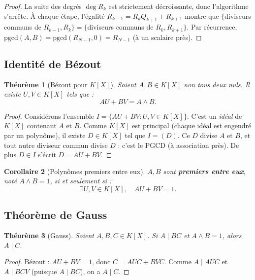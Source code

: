 \documentclass[12pt,a4paper]{report}
\newtheorem{theoreme}{Théorème}[section]
\newtheorem{corollaire}[theoreme]{Corollaire}
\theoremstyle{definition}
\theoremstyle{remark}
\begin{document}
\begin{proof}
La suite des degrés $\deg R_k$ est strictement décroissante, donc l'algorithme s'arrête. À chaque étape, l'égalité $R_{k-1} = R_k Q_{k+1} + R_{k+1}$ montre que $\{$diviseurs communs de $R_{k-1}, R_k\} = \{$diviseurs communs de $R_k, R_{k+1}\}$. Par récurrence, $\mathrm{pgcd}(A, B) = \mathrm{pgcd}(R_{N-1}, 0) = R_{N-1}$ (à un scalaire près).
\end{proof}

\subsection{Identité de Bézout}

\begin{theoreme}[{Bézout pour $K[X]$}]
Soient $A, B \in K[X]$ non tous deux nuls. Il existe $U, V \in K[X]$ tels que :
\[ A U + B V = A \wedge B. \]
\end{theoreme}

\begin{proof}
Considérons l'ensemble $I = \{ A U + B V : U, V \in K[X]\}$. C'est un \emph{idéal} de $K[X]$ contenant $A$ et $B$. Comme $K[X]$ est principal (chaque idéal est engendré par un polynôme), il existe $D \in K[X]$ tel que $I = (D)$. Ce $D$ divise $A$ et $B$, et tout autre diviseur commun divise $D$ : c'est le PGCD (à association près). De plus $D \in I$ s'écrit $D = A U + B V$.
\end{proof}

\begin{corollaire}[Polynômes premiers entre eux]
$A, B$ sont \textbf{premiers entre eux}, noté $A \wedge B = 1$, si et seulement si :
\[ \exists U, V \in K[X],\quad A U + B V = 1. \]
\end{corollaire}

\subsection{Théorème de Gauss}

\begin{theoreme}[Gauss]
Soient $A, B, C \in K[X]$. Si $A \mid B C$ et $A \wedge B = 1$, alors $A \mid C$.
\end{theoreme}

\begin{proof}
Bézout : $A U + B V = 1$, donc $C = A U C + B V C$. Comme $A \mid A U C$ et $A \mid B C V$ (puisque $A \mid B C$), on a $A \mid C$.
\end{proof}
\end{document}
